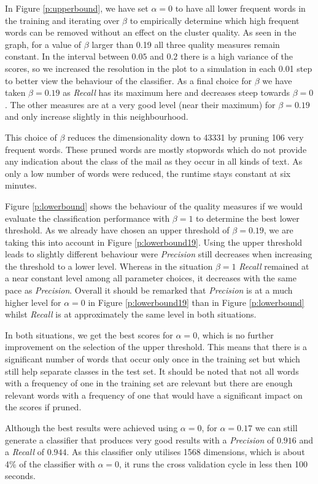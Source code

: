 In Figure \ref{p:upperbound}, we have set $\alpha = 0$ to have all lower frequent words in the training and iterating over $\beta$ to empirically determine which high frequent words can be removed without an effect on the cluster quality.
As seen in the graph, for a value of $\beta$ larger than 0.19 all three quality measures remain constant.
In the interval between $0.05$ and $0.2$ there is a high variance of the scores, so we increased the resolution in the plot to a simulation in each 0.01 step to better view the behaviour of the classifier.
As a final choice for $\beta$ we have taken $\beta = 0.19$ as \emph{Recall} has its maximum here and decreases steep towards $\beta = 0$.
The other measures are at a very good level (near their maximum) for $\beta = 0.19$ and only increase slightly in this neighbourhood.

This choice of $\beta$ reduces the dimensionality down to 43331 by pruning 106 very frequent words.
These pruned words are mostly stopwords which do not provide any indication about the class of the mail as they occur in all kinds of text.
As only a low number of words were reduced, the runtime stays constant at six minutes.



Figure \ref{p:lowerbound} shows the behaviour of the quality measures if we would evaluate the classification performance with $\beta=1$ to determine the best lower threshold.
As we already have chosen an upper threshold of $\beta = 0.19$, we are taking this into account in Figure \ref{p:lowerbound19}.
Using the upper threshold leads to slightly different behaviour were \emph{Precision} still decreases when increasing the threshold to a lower level.
Whereas in the situation $\beta = 1$ \emph{Recall} remained at a near constant level among all parameter choices, it decreases with the same pace as \emph{Precision}.
Overall it should be remarked that \emph{Precision} is at a much higher level for $\alpha = 0$ in Figure \ref{p:lowerbound19} than in Figure \ref{p:lowerbound} whilst \emph{Recall} is at approximately the same level in both situations.

In both situations, we get the best scores for $\alpha=0$, which is no further improvement on the selection of the upper threshold.
This means that there is a significant number of words that occur only once in the training set but which still help separate classes in the test set.
It should be noted that not all words with a frequency of one in the training set are relevant but there are enough relevant words with a frequency of one that would have a significant impact on the scores if pruned.

Although the best results were achieved using $\alpha=0$, for $\alpha=0.17$ we can still generate a classifier that produces very good results with a \emph{Precision} of $0.916$ and a \emph{Recall} of $0.944$.
As this classifier only utilises 1568 dimensions, which is about 4\% of the classifier with $\alpha=0$, it runs the cross validation cycle in less then 100 seconds.



% 
